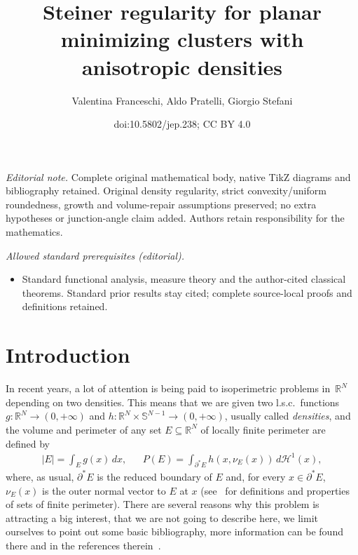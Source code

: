 \documentclass[10pt]{amsart}
\title{Steiner regularity for planar minimizing clusters with anisotropic densities}
\author{Valentina Franceschi, Aldo Pratelli, Giorgio Stefani}
\date{doi:10.5802/jep.238; CC BY 4.0}
\newcommand\R{\mathbb{R}}
\renewcommand\S{\mathbb{S}}
\renewcommand\H{\mathcal{H}}
\theoremstyle{plain}
\theoremstyle{definition}
\providecommand{\mainmatter}{}\providecommand{\backmatter}{}
\begin{document}
\maketitle
\noindent\textit{Editorial note.} Complete original mathematical body, native TikZ diagrams and bibliography retained. Original density regularity, strict convexity/uniform roundedness, growth and volume-repair assumptions preserved; no extra hypotheses or junction-angle claim added. Authors retain responsibility for the mathematics.\par\medskip
\noindent\textit{Allowed standard prerequisites (editorial).}\begin{itemize}
\item Standard functional analysis, measure theory and the author-cited classical theorems. Standard prior results stay cited; complete source-local proofs and definitions retained.
\end{itemize}\medskip
\tableofcontents
\mainmatter

\section{Introduction}

In recent years, a lot of attention is being paid to isoperimetric problems in~$\R^N$ depending on two densities. This means that we are given two l.s.c.\ functions \hbox{$g:\R^N\to (0,+\infty)$} and $h:\R^N\times\S^{N-1}\to (0,+\infty)$, usually called \emph{densities}, and the volume and perimeter of any set $E\subseteq\R^N$ of locally finite perimeter are defined by
\begin{align}\label{weightedvolper}
|E| = \int_E g(x)\,dx, && P(E) = \int_{\partial^* E} h(x,\nu_E(x))\, d\H^1(x),
\end{align}
where, as usual, $\partial^* E$ is the reduced boundary of $E$ and, for every $x\in\partial^* E$, $\nu_E(x)$ is the outer normal vector to $E$ at $x$ (see~\cite{AFP} for definitions and properties of sets of finite perimeter). There are several reasons why this problem is attracting a big interest, that we are not going to describe here, we limit ourselves to point out some basic bibliography, more information can be found there and in the references therein~\cite{RCBM08,CMV10,CRS12,MP13,BBCLT16,ABCMP17,DFP,G18,ABCMP19,CGPRS20,FP20}.
\end{document}

